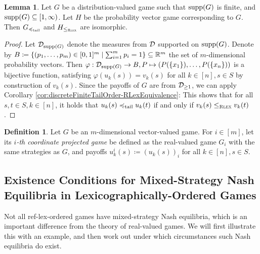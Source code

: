\documentclass[a4paper]{scrreprt}
\let\phi\varphi
\theoremstyle{definition}
\newtheorem{lemma}[thm]{Lemma} %
\newtheorem{defn}[thm]{Definition} %
\begin{document}
    \begin{lemma}
        Let $G$ be a distribution-valued game such that $\operatorname{supp}(G)$ is finite, and $\operatorname{supp}(G) \subseteq [1, \infty)$.
        Let $H$ be the probability vector game corresponding to $G$.
        Then  $G_{\preccurlyeq_{\text{tail}}}$ and $H_{\leq_{\textsc{Rlex}}}$ are isomorphic.
    \end{lemma}
    \begin{proof}
        Let $\mathcal{D}_{\operatorname{supp}(G)}$ denote the measures from $\mathcal{D}$ supported on $\operatorname{supp}(G)$.
        Denote by $B \coloneqq \{(p_1, \dots, p_m) \in [0, 1]^m \mid \sum_{i=1}^{m} p_i = 1\} \subseteq \mathbb{R}^m$ the set of $m$-dimensional probability vectors.
        Then $\phi: \DP_{\supp(G)} \to B, P \mapsto (P(\set{x_1}), \dots, P(\set{x_n}))$ is a bijective function, satisfying $\phi(u_k(s)) = v_k(s)$ for all $k \in [n], s \in S$ by construction of $v_k(s)$.
        Since the payoffs of $G$ are from $\mathcal{D}_{\geq 1}$, we can apply Corollary \ref{cor:discreteFiniteTailOrder-RLexEquivalence}:
        This shows that for all $s, t \in S, k \in [n]$, it holds that $u_k(s) \preccurlyeq_{\text{tail}} u_k(t)$ if and only if $v_k(s) \leq_{\textsc{Rlex}} v_k(t)$.
    
    \end{proof}

    \begin{defn}
        Let $G$ be an $m$-dimensional vector-valued game. For $i \in [m]$, let its \emph{$i$-th coordinate projected game}
        be defined as the real-valued game $G_i$ with the same strategies as $G$, and payoffs
        $u^i_k(s) \coloneqq (u_k(s))_i$ for all $k \in [n], s \in S$.
    \end{defn}

    \subsection[Existence Conditions for Mixed-Strategy Nash Equilibria in\\ Lexicographically-Ordered Games]{Existence Conditions for Mixed-Strategy Nash Equilibria in Lexicographically-Ordered Games}
    Not all ref-lex-ordered games have mixed-strategy Nash equilibria, which is an important difference from the theory of real-valued games. We will first illustrate this with an example, and then work out under which circumstances such Nash equilibria do exist.
    
    \newcommand{\Gproj}[1]{G_{#1}}
    \newcommand{\Gprojsub}[1]{\bar{G}_{#1}}
    
\end{document}
